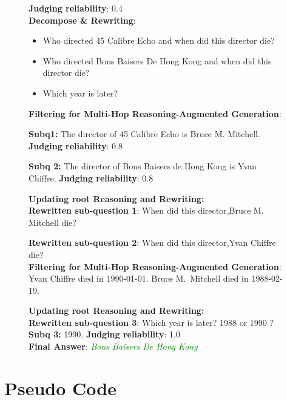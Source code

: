 \documentclass[11pt]{article}
\begin{document}
\begin{figure}[h!]
\begin{minipage}{0.98\textwidth}
\begin{tcolorbox}[
  breakable,
  colback=white,
  colframe=black,
  boxrule=0.8pt,
  arc=1pt,
  left=6pt,right=6pt,top=6pt,bottom=6pt
]
\textbf{Judging reliability}: 0.4\\
\textbf{Decompose \& Rewriting}: 
\begin{itemize}
  \setlength{\itemsep}{-2pt}
  \setlength{\topsep}{0pt}
  \setlength{\parsep}{0pt}
  \setlength{\partopsep}{0pt}
  \item Who directed 45 Calibre Echo and when did this director die?
  \item Who directed Bons Baisers De Hong Kong and when did this director die?
  \item Which year is later?
\end{itemize}

\textbf{Filtering for Multi-Hop Reasoning-Augmented Generation}: 

\textbf{Subq1:} The director of 45 Calibre Echo is Bruce M. Mitchell. \textbf{Judging reliability}: 0.8 

\textbf{Subq 2:} The director of Bons Baisers de Hong Kong is Yvan Chiffre. \textbf{Judging reliability}: 0.8

\textbf{Updating root Reasoning and Rewriting:}\\
\textbf{Rewritten sub-question 1}: When did this director,Bruce M. Mitchell die?

\textbf{Rewritten sub-question 2}: When did this director,Yvan Chiffre die?\\
\textbf{Filtering for Multi-Hop Reasoning-Augmented Generation}: 
Yvan Chiffre died in 1990-01-01. Bruce M.\ Mitchell died in 1988-02-19.

\textbf{Updating root Reasoning and Rewriting:}\\
\textbf{Rewritten sub-question 3}: Which year is later? 1988 or 1990 ?\\
\textbf{Subq 3:} 1990. \textbf{Judging reliability}: 1.0\\
\textbf{Final Answer}: {\textcolor{green}{\textit{Bons Baisers De Hong Kong}}}

\end{tcolorbox}
\end{minipage}

\label{fig:case_study}
\end{figure} 


\twocolumn
\section{Pseudo Code}
\label{sec:Pseudo Code}
\end{document}
